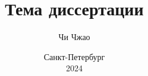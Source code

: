 \documentclass[hidelinks,fontsize=14pt,paper=a4,pagesize,DIV=calc]{gost}
\author{Чи Чжао}
\date{Санкт-Петербург\\ 2024}
\title{Тема диссертации}
\begin{document}
\maketitlepage

\tableofcontents













\end{document}

